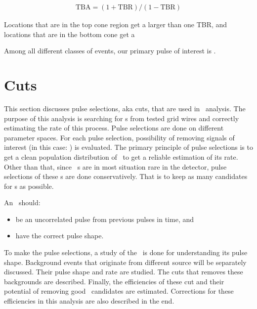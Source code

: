 \begin{align}
	\text{TBA} = (1+\text{TBR})/(1-\text{TBR})
\end{align}

Locations that are in the top cone region get a larger than one TBR, and locations that are in the bottom cone get a  


Among all different classes of events, our primary pulse of interest is \eep . 



\section{Cuts}

This section discusses pulse selections, aka cuts, that are used in \gtest\ analysis. The purpose of this analysis is searching for \eep s from tested grid wires and correctly estimating the rate of this process. Pulse selections are done on different parameter spaces. For each pulse selection, possibility of removing signals of interest (in this case: \eep ) is evaluated. The primary principle of pulse selections is to get a clean population distribution of \eep\ to get a reliable estimation of its rate. Other than that, since \eep\ s are in most situation rare in the detector, pulse selections of these \eep s are done conservatively. That is to keep as many candidates for \eep s as possible. 

An \eep\ should: 
\begin{itemize}
\item be an uncorrelated pulse from previous pulses in time, and
\item have the correct pulse shape.
\end{itemize}

To make the pulse selections, a study of the \eep\ is done for understanding its pulse shape. Background events that originate from different source will be separately discussed. Their pulse shape and rate are studied. The cuts that removes these backgrounds are described. Finally, the efficiencies of these cut and their potential of removing good \eep\ candidates are estimated. Corrections for these efficiencies in this analysis are also described in the end.  

